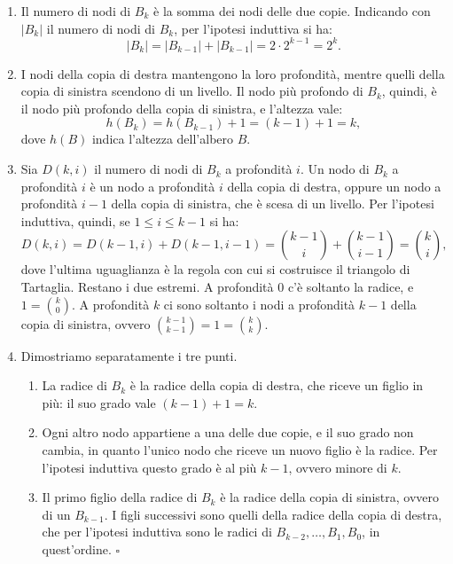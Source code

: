 \begin{enumerate}
    \item Il numero di nodi di $B_k$ è la somma dei nodi delle due copie. Indicando con $|B_k|$ il numero di nodi di $B_k$, per l'ipotesi induttiva si ha:
    \[
    |B_k| = |B_{k-1}| + |B_{k-1}| = 2 \cdot 2^{k-1} = 2^k.
    \]
    \item I nodi della copia di destra mantengono la loro profondità, mentre quelli della copia di sinistra scendono di un livello. Il nodo più profondo di $B_k$, quindi, è il nodo più profondo della copia di sinistra, e l'altezza vale:
    \[
    h(B_k) = h(B_{k-1}) + 1 = (k-1) + 1 = k,
    \]
    dove $h(B)$ indica l'altezza dell'albero $B$.
    \item Sia $D(k,i)$ il numero di nodi di $B_k$ a profondità $i$. Un nodo di $B_k$ a profondità $i$ è un nodo a profondità $i$ della copia di destra, oppure un nodo a profondità $i-1$ della copia di sinistra, che è scesa di un livello. Per l'ipotesi induttiva, quindi, se $1 \le i \le k-1$ si ha:
    \[
    D(k,i) = D(k-1,i) + D(k-1,i-1) = \binom{k-1}{i} + \binom{k-1}{i-1} = \binom{k}{i},
    \]
    dove l'ultima uguaglianza è la regola con cui si costruisce il triangolo di Tartaglia. Restano i due estremi. A profondità $0$ c'è soltanto la radice, e $1 = \binom{k}{0}$. A profondità $k$ ci sono soltanto i nodi a profondità $k-1$ della copia di sinistra, ovvero $\binom{k-1}{k-1} = 1 = \binom{k}{k}$.
    \item Dimostriamo separatamente i tre punti.
    \begin{enumerate}[label=(\alph*)]
        \item La radice di $B_k$ è la radice della copia di destra, che riceve un figlio in più: il suo grado vale $(k-1) + 1 = k$.
        \item Ogni altro nodo appartiene a una delle due copie, e il suo grado non cambia, in quanto l'unico nodo che riceve un nuovo figlio è la radice. Per l'ipotesi induttiva questo grado è al più $k-1$, ovvero minore di $k$.
        \item Il primo figlio della radice di $B_k$ è la radice della copia di sinistra, ovvero di un $B_{k-1}$. I figli successivi sono quelli della radice della copia di destra, che per l'ipotesi induttiva sono le radici di $B_{k-2}, \ldots, B_1, B_0$, in quest'ordine. \hfill $\square$
    \end{enumerate}
\end{enumerate}

